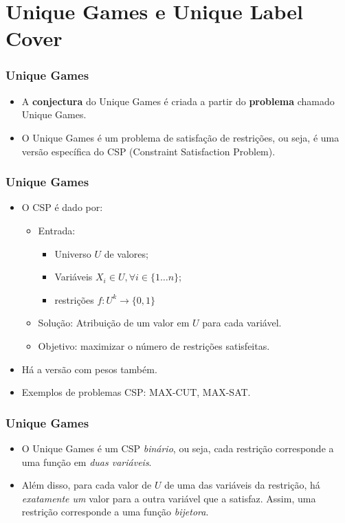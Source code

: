 \documentclass[11pt, handout]{beamer}
\begin{document}
\section{Unique Games e Unique Label Cover}

\begin{frame}[<+->]
    \frametitle{Unique Games}
    \begin{itemize}
        \item A \textbf{conjectura} do Unique Games é criada a partir do \textbf{problema} chamado Unique Games.
        \item O Unique Games é um problema de satisfação de restrições, ou seja, é uma versão específica do CSP (Constraint Satisfaction Problem).
    \end{itemize}
\end{frame}

\begin{frame}[<+->]
    \frametitle{Unique Games}
    \begin{itemize}
        \item O CSP é dado por:
        \begin{itemize}
            \item Entrada:
                \begin{itemize}
                    \item Universo $U$ de valores;
                    \item Variáveis $X_i \in U, \forall i \in \{1 \dots n\}$;
                    \item restrições $f:U^k \xrightarrow{} \{0,1\}$
                \end{itemize}
            \item Solução: Atribuição de um valor em $U$ para cada variável.
            \item Objetivo: maximizar o número de restrições satisfeitas.
        \end{itemize}
        \item Há a versão com pesos também.
        \item Exemplos de problemas CSP: MAX-CUT, MAX-SAT.
    \end{itemize}
\end{frame}

\begin{frame}[<+->]
    \frametitle{Unique Games}
    \begin{itemize}
        \item O Unique Games é um CSP \emph{binário}, ou seja, cada restrição corresponde a uma função em \emph{duas variáveis}.
        \item Além disso, para cada valor de $U$ de uma das variáveis da restrição, há \emph{exatamente um} valor para a outra variável que a satisfaz. Assim, uma restrição corresponde a uma função \emph{bijetora}.
    \end{itemize}
\end{frame}
\end{document}
